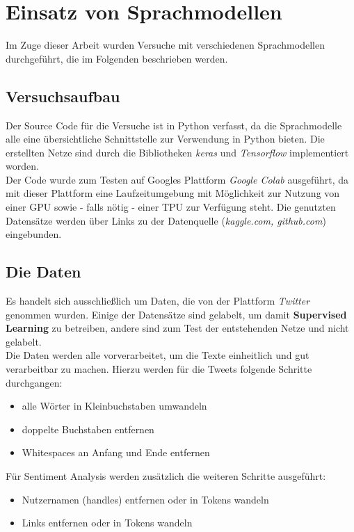 \chapter{Einsatz von Sprachmodellen}
Im Zuge dieser Arbeit wurden Versuche mit verschiedenen Sprachmodellen durchgef\"uhrt, die im Folgenden beschrieben werden.

\section{Versuchsaufbau}
Der Source Code f\"ur die Versuche ist in Python verfasst, da die Sprachmodelle alle eine \"ubersichtliche Schnittstelle zur Verwendung in Python bieten. Die erstellten Netze sind durch die Bibliotheken \textit{keras} \cite{keras} und \textit{Tensorflow} \cite{tensorflow} implementiert worden. \\
Der Code wurde zum Testen auf Googles Plattform \textit{Google Colab} \cite{colab} ausgef\"uhrt, da mit dieser Plattform eine Laufzeitumgebung mit M\"oglichkeit zur Nutzung von einer GPU sowie - falls n\"otig - einer TPU zur Verf\"ugung steht. Die genutzten Datens\"atze werden \"uber Links zu der Datenquelle (\textit{kaggle.com, github.com}) eingebunden.


\section{Die Daten}
Es handelt sich ausschlie{\ss}lich um Daten, die von der Plattform \textit{Twitter} genommen wurden. Einige der Datens\"atze sind gelabelt, um damit \textbf{Supervised Learning} zu betreiben, andere sind zum Test der entstehenden Netze und nicht gelabelt.\\
Die Daten werden alle vorverarbeitet, um die Texte einheitlich und gut verarbeitbar zu machen. Hierzu werden f\"ur die Tweets folgende Schritte durchgangen:
\begin{itemize}
\item alle W\"orter in Kleinbuchstaben umwandeln
\item doppelte Buchstaben entfernen %
\item Whitespaces an Anfang und Ende entfernen

\end{itemize}
F\"ur Sentiment Analysis werden zus\"atzlich die weiteren Schritte ausgef\"uhrt:
\begin{itemize}
\item Nutzernamen (handles) entfernen oder in Tokens wandeln
\item Links entfernen oder in Tokens wandeln
\end{itemize}

